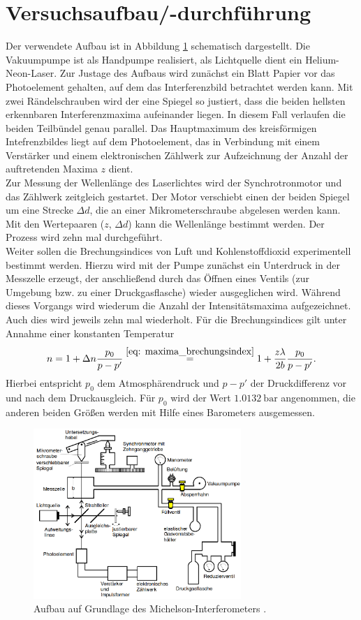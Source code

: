 \section{Versuchsaufbau/-durchführung}
Der verwendete Aufbau ist in Abbildung \ref{fig: aufbau} schematisch dargestellt. Die Vakuumpumpe ist als Handpumpe
realisiert, als Lichtquelle dient ein Helium-Neon-Laser. Zur Justage des Aufbaus wird zunächst ein Blatt Papier vor das Photoelement gehalten,
auf dem das Interferenzbild betrachtet werden kann. Mit zwei Rändelschrauben wird der eine Spiegel so justiert,
dass die beiden hellsten erkennbaren Interferenzmaxima
aufeinander liegen. In diesem Fall verlaufen die beiden Teilbündel genau parallel. Das Hauptmaximum des kreisförmigen Intefrenzbildes
liegt auf dem Photoelement, das in Verbindung mit einem Verstärker und einem elektronischen Zählwerk zur Aufzeichnung der Anzahl
der auftretenden Maxima $z$ dient.\\
Zur Messung der Wellenlänge des Laserlichtes wird der Synchrotronmotor und das Zählwerk zeitgleich gestartet. Der Motor verschiebt einen
der beiden Spiegel um eine Strecke $\Delta d$, die an einer Mikrometerschraube abgelesen werden kann. Mit den Wertepaaren ($z$, $\Delta d$) kann
die Wellenlänge bestimmt werden. Der Prozess wird zehn mal durchgeführt. \\
Weiter sollen die Brechungsindices von Luft und Kohlenstoffdioxid experimentell bestimmt werden. Hierzu  wird mit der Pumpe zunächst ein Unterdruck
in der Messzelle erzeugt, der anschließend
durch das Öffnen eines Ventils (zur Umgebung bzw. zu einer Druckgasflasche) wieder ausgeglichen wird. Während dieses Vorgangs wird wiederum die
Anzahl der Intensitätsmaxima aufgezeichnet. Auch dies wird jeweils zehn mal wiederholt. Für die Brechungsindices gilt unter Annahme einer konstanten
Temperatur
\begin{equation}
  \label{eq: brechungsindex}
  n = 1 + \Delta n \frac{p_0}{p - p'} \overset{\eqref{eq: maxima_brechungsindex}}{=} 1 + \frac{z \lambda}{2b} \frac{p_0}{p - p'} .
\end{equation}
Hierbei entspricht $p_0$ dem Atmosphärendruck und $p - p'$ der Druckdifferenz vor und nach dem Druckausgleich. Für $p_0$ wird der Wert $\SI{1.0132}{\bar}$ angenommen,
die anderen beiden Größen werden mit Hilfe eines Barometers ausgemessen.
\begin{figure}
  \centering
  \includegraphics[width = 0.7\textwidth]{table/aufbau.png}
  \caption{Aufbau auf Grundlage des Michelson-Interferometers \cite{anleitung401}.}
  \label{fig: aufbau}
\end{figure}
